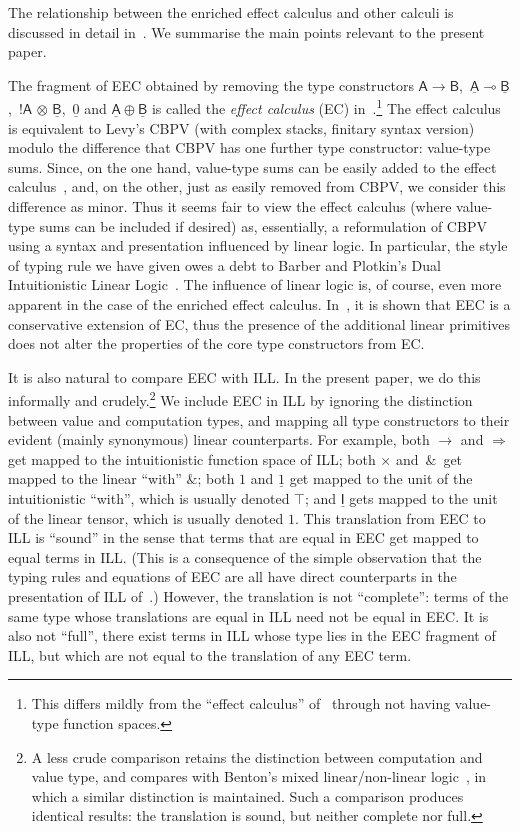\documentclass{LMCS}
\newcommand{\comptype}[1]{\underline{#1}}
\newcommand{\VA}{\mathsf{A}}
\newcommand{\VB}{\mathsf{B}}
\newcommand{\CA}{\comptype{\mathsf{A}}}
\newcommand{\CB}{\comptype{\mathsf{B}}}
\newcommand{\CI}{\comptype{\mathsf{I}}}
\newcommand{\Vone}{1}
\newcommand{\Vprod}{\times}
\newcommand{\Vfun}{\to}
\newcommand{\lpop}{\multimap}
\newcommand{\Cone}{\comptype{1}}
\newcommand{\Cprod}{\,\&\,}
\newcommand{\Cfun}{\Rightarrow}
\newcommand{\Ccopower}[2]{! #1 \, {\otimes} \, #2}
\newcommand{\Czero}{\comptype{0}}
\newcommand{\Cplus}{\oplus}
\begin{document}
The relationship between the enriched effect calculus and other calculi is discussed in
detail in~\cite{EMSb}. We summarise the main points relevant to the present paper.

The fragment of EEC obtained by removing the type constructors $\VA \Vfun \VB$,
$\,\CA \lpop \CB$, 
$\, \Ccopower{\VA}{\CB}$, $\, \Czero$ and $\CA \Cplus \CB$ is called the
\emph{effect calculus} (EC) in~\cite{EMSb}.\footnote{This differs mildly from the ``effect calculus''
of~\cite{EMSb} through not having value-type function spaces.} The effect calculus is
equivalent to Levy's CBPV (with complex stacks, finitary syntax version) modulo
the difference that CBPV has one further type constructor:
value-type sums. Since, on the one hand, value-type sums can be easily added to the 
effect calculus~\cite{EMS}, and,
on the other, just as easily removed from CBPV, we consider this difference as minor.
Thus it seems fair to view the effect calculus (where value-type sums can be included
if desired) as, essentially,  a reformulation of CBPV using a syntax and
presentation influenced 
by linear logic. 
In particular,
the style of typing rule we have given owes a debt to 
Barber and Plotkin's Dual Intuitionistic Linear Logic~\cite{Barber:97}.
The influence of linear logic is, of course, even  more apparent
in the case of the enriched effect calculus.
In~\cite{EMS,EMSc}, it is shown that EEC is a conservative extension
of EC, thus the presence of the additional linear primitives does not alter the 
properties of the core type constructors from EC.

It is also natural to compare EEC with ILL. In the present paper, we do this
informally and crudely.\footnote{A less crude comparison retains the distinction between
computation and value type, and compares with Benton's mixed linear/non-linear
logic~\cite{Benton:95}, in which a similar distinction is maintained.
Such a comparison produces identical results: the translation is sound, but
neither complete nor full.}
We include EEC in ILL by ignoring the distinction between value and computation
types, and mapping all type constructors to their evident (mainly synonymous)
linear counterparts. For example, both $\Vfun$ and $\Cfun$ get mapped to
the intuitionistic function space of ILL; both $\Vprod$ and $\Cprod$ get mapped to
the linear ``with'' $\&$; both $\Vone$ and $\Cone$ get mapped to the unit of
the intuitionistic ``with'', which is usually denoted $\top$; and $\CI$ gets mapped
to the unit of the linear tensor, which is usually denoted $1$. This translation
from EEC to ILL is ``sound'' in the sense that terms that are equal in EEC get mapped to
equal terms in ILL. (This is a consequence of the simple observation that the typing rules
and equations of EEC are all have direct counterparts in 
the presentation of ILL of~\cite{Barber:97}.) However, the translation
is not ``complete'': 
terms of the same type whose translations are equal in ILL need not be equal
in EEC. It is also not ``full'', there exist terms in ILL whose type lies in the
EEC fragment of ILL, but which are not equal to the translation of any EEC term.
\end{document}
